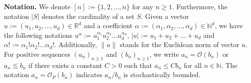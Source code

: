 \vspace{0.5 em}
\noindent
\textbf{Notation.} We denote $[n] := \{1,2,\ldots,n\}$ for any $n \geq 1$. Furthermore, the notation $|S|$ denotes the cardinality of a set $S$. Given a vector $u:=(u_1,u_2,\ldots,u_d) \in \mathbb{R}^{d}$ and a coefficient $\alpha:=(\alpha_1,\alpha_2,\ldots,\alpha_d)\in\mathbb{N}^d$, we have the following notations $u^{\alpha} :=u_{1}^{\alpha_{1}}u_{2}^{\alpha_{2}}\ldots u_{d}^{\alpha_{d}}$, $|u|:=u_1+u_2+\ldots+u_d$ and $\alpha!:=\alpha_{1}!\alpha_{2}!\ldots \alpha_{d}!$. Additionally, $\|u\|$ stands for the Euclidean norm of vector $u$. For positive sequences $(a_n)_{n\geq 1}$ and $(b_n)_{n\geq 1}$, we write $a_n = \mathcal{O}(b_n)$ or $a_{n} \lesssim b_{n}$ if there exists a constant $C > 0$ such that $a_n \leq C b_n$ for all $ n\in\mathbb{N}$. The notation $a_{n} = \mathcal{O}_{P}(b_{n})$ indicates $a_{n}/b_{n}$ is stochastically bounded.






